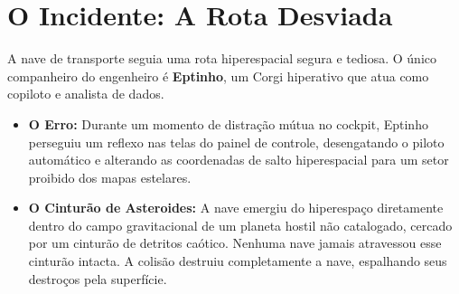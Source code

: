 \documentclass[a4paper,12pt]{report}
\begin{document}
\section{O Incidente: A Rota Desviada}
A nave de transporte seguia uma rota hiperespacial segura e tediosa. O único companheiro do engenheiro é \textbf{Eptinho}, um Corgi hiperativo que atua como copiloto e analista de dados.
\begin{itemize}
    \item \textbf{O Erro:} Durante um momento de distração mútua no cockpit, Eptinho perseguiu um reflexo nas telas do painel de controle, desengatando o piloto automático e alterando as coordenadas de salto hiperespacial para um setor proibido dos mapas estelares.
    \item \textbf{O Cinturão de Asteroides:} A nave emergiu do hiperespaço diretamente dentro do campo gravitacional de um planeta hostil não catalogado, cercado por um cinturão de detritos caótico. Nenhuma nave jamais atravessou esse cinturão intacta. A colisão destruiu completamente a nave, espalhando seus destroços pela superfície.
\end{itemize}
\end{document}
